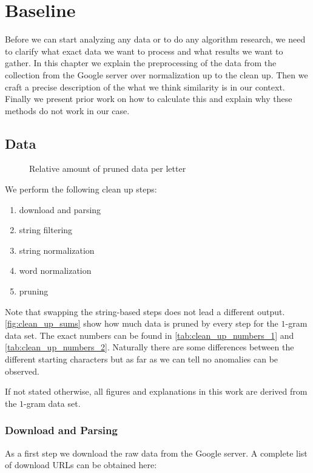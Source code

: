 \chapter{Baseline}
\label{ch:baseline}

Before we can start analyzing any data or to do any algorithm research, we need to clarify what exact data we want to process and what results we want to gather. In this chapter we explain the preprocessing of the data from the collection from the Google server over normalization up to the clean up. Then we craft a precise description of the what we think similarity is in our context. Finally we present prior work on how to calculate this and explain why these methods do not work in our case.



\section{Data}
\label{sec:baseline:data}

\begin{figure}
    \centering
    
    \caption{Relative amount of pruned data per letter}\label{fig:clean_up_sums}
\end{figure}

We perform the following clean up steps:

\begin{enumerate}
    \itemsep0em
    \item download and parsing
    \item string filtering
    \item string normalization
    \item word normalization
    \item pruning
\end{enumerate}

Note that swapping the string-based steps does not lead a different output. \autoref{fig:clean_up_sums} show how much data is pruned by every step for the $1$-gram data set. The exact numbers can be found in \autoref{tab:clean_up_numbers_1} and \autoref{tab:clean_up_numbers_2}. Naturally there are some differences between the different starting characters but as far as we can tell no anomalies can be observed.

If not stated otherwise, all figures and explanations in this work are derived from the $1$-gram data set.


\subsection{Download and Parsing}
\label{ssec:baseline:data:download}
As a first step we download the raw data from the Google server. A complete list of download URLs can be obtained here:

